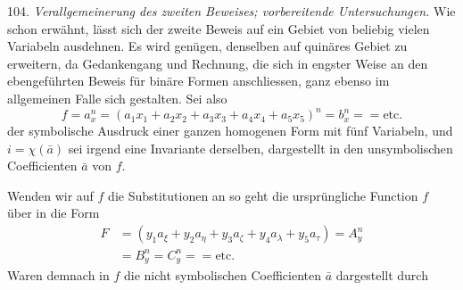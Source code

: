 104. \textit{Verallgemeinerung des zweiten Beweises; vorbereitende Untersuchungen.} Wie schon erwähnt, lässt sich der zweite Beweis auf ein Gebiet von beliebig vielen Variabeln ausdehnen. Es wird genügen, denselben auf quinäres Gebiet zu erweitern, da Gedankengang und Rechnung, die sich in engster Weise an den ebengeführten Beweis für binäre Formen anschliessen, ganz ebenso im allgemeinen Falle sich gestalten. Sei also
\[
f = a_x^n = (a_1 x_1 + a_2 x_2 + a_3 x_3 + a_4 x_4 + a_5 x_5)^n = b_x^n = = \text{etc.} %
\]
der symbolische Ausdruck einer ganzen homogenen Form mit fünf Variabeln, und $i = \chi(\bar a)$ sei irgend eine Invariante derselben, dargestellt in den unsymbolischen Coefficienten $\bar a$ von $f$.

Wenden wir auf $f$ die Substitutionen an
so geht die ursprüngliche Function $f$ über in die Form
\[
\begin{aligned}
F &= (y_1 a_\xi + y_2 a_\eta + y_3 a_\zeta + y_4 a_\lambda + y_5 a_\tau) = A_y^n\\
&= B_y^n = C_y^n = = \text{etc.} %
\end{aligned}
\]
Waren demnach in $f$ die nicht symbolischen Coefficienten $\bar a$ dargestellt durch


